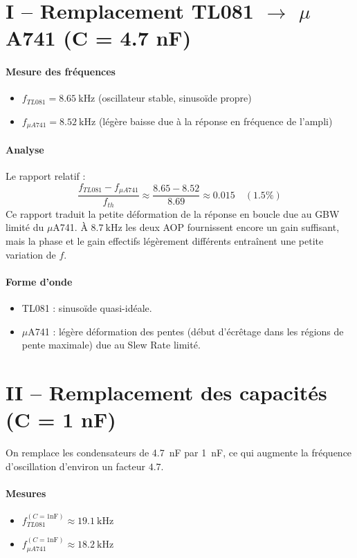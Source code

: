 \documentclass[11pt,a4paper]{report}
\begin{document}
\section{I -- Remplacement TL081 $\rightarrow$ $\mu$A741 (C = 4.7 nF)}
\paragraph{Mesure des fréquences}
\begin{itemize}
    \item \(f_{TL081} = \SI{8.65}{\kilo\hertz}\) (oscillateur stable, sinusoïde propre)
    \item \(f_{\mu A741} = \SI{8.52}{\kilo\hertz}\) (légère baisse due à la réponse en fréquence de l'ampli)
\end{itemize}

\paragraph{Analyse}
Le rapport relatif :
\[
\frac{f_{TL081} - f_{\mu A741}}{f_{th}} \approx \frac{8.65 - 8.52}{8.69} \approx 0.015 \quad (1.5\%)
\]
Ce rapport traduit la petite déformation de la réponse en boucle due au GBW limité du $\mu$A741. À \(\SI{8.7}{\kilo\hertz}\) les deux AOP fournissent encore un gain suffisant, mais la phase et le gain effectifs légèrement différents entraînent une petite variation de $f$.

\paragraph{Forme d'onde}
\begin{itemize}
    \item TL081 : sinusoïde quasi-idéale.
    \item $\mu$A741 : légère déformation des pentes (début d'écrêtage dans les régions de pente maximale) due au Slew Rate limité.
\end{itemize}

\section{II -- Remplacement des capacités (C = 1 nF)}
On remplace les condensateurs de \SI{4.7}{\nano\farad} par \SI{1}{\nano\farad}, ce qui augmente la fréquence d'oscillation d'environ un facteur \(4.7\).

\paragraph{Mesures}
\begin{itemize}
    \item \(f_{TL081}^{(C=1\text{nF})} \approx \SI{19.1}{\kilo\hertz}\)
    \item \(f_{\mu A741}^{(C=1\text{nF})} \approx \SI{18.2}{\kilo\hertz}\)
\end{itemize}
\end{document}

